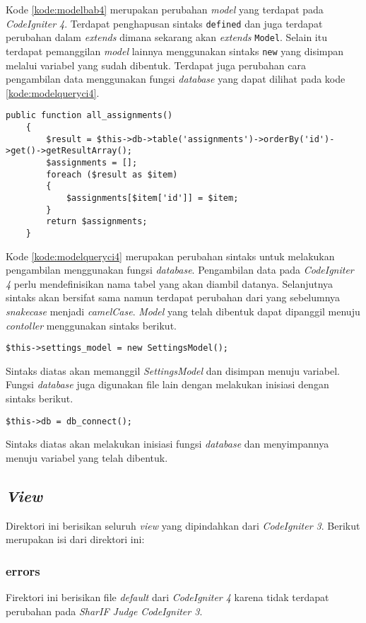 Kode \ref{kode:modelbab4} merupakan perubahan \textit{model} yang terdapat pada \textit{CodeIgniter 4}. Terdapat penghapusan sintaks \texttt{defined} dan juga terdapat perubahan dalam \textit{extends} dimana sekarang akan \textit{extends} \texttt{Model}. Selain itu terdapat pemanggilan \textit{model} lainnya menggunakan sintaks \texttt{new} yang disimpan melalui variabel yang sudah dibentuk. Terdapat juga perubahan cara pengambilan data menggunakan fungsi \textit{database} yang dapat dilihat pada kode \ref{kode:modelqueryci4}.

\begin{lstlisting}[caption=Perubahan sintaks pada \textit{model}, label=kode:modelqueryci4]
	public function all_assignments()
	{
		$result = $this->db->table('assignments')->orderBy('id')->get()->getResultArray();
		$assignments = [];
		foreach ($result as $item)
		{
			$assignments[$item['id']] = $item;
		}
		return $assignments;
	}
\end{lstlisting}

Kode \ref{kode:modelqueryci4} merupakan perubahan sintaks untuk melakukan pengambilan menggunakan fungsi \textit{database}. Pengambilan data pada \textit{CodeIgniter 4} perlu mendefinisikan nama tabel yang akan diambil datanya. Selanjutnya sintaks akan bersifat sama namun terdapat perubahan dari yang sebelumnya \textit{snakecase} menjadi \textit{camelCase}. \textit{Model} yang telah dibentuk dapat dipanggil menuju \textit{contoller} menggunakan sintaks berikut.

\begin{center}
\verb|$this->settings_model = new SettingsModel();|
\end{center}

Sintaks diatas akan memanggil \textit{SettingsModel} dan disimpan menuju variabel. Fungsi \textit{database} juga digunakan file lain dengan melakukan inisiasi dengan sintaks berikut.
\begin{center}
	\verb|$this->db = db_connect();|
\end{center}
Sintaks diatas akan melakukan inisiasi fungsi \textit{database} dan menyimpannya menuju variabel yang telah dibentuk.

\subsection{\textit{View}}
Direktori ini berisikan seluruh \textit{view} yang dipindahkan dari \textit{CodeIgniter 3}. Berikut merupakan isi dari direktori ini:
\subsubsection{errors}
Firektori ini berisikan file \textit{default} dari \textit{CodeIgniter 4} karena tidak terdapat perubahan pada \textit{SharIF Judge} \textit{CodeIgniter 3}.
